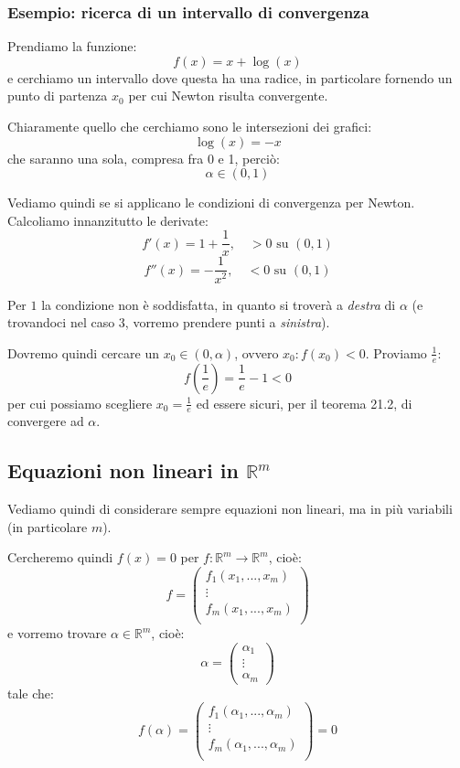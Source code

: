 \documentclass[a4paper,11pt]{article}
\begin{document}
\subsubsection{Esempio: ricerca di un intervallo di convergenza}
Prendiamo la funzione:
$$
f(x) = x + \log(x)
$$
e cerchiamo un intervallo dove questa ha una radice, in particolare fornendo un punto di partenza $x_0$ per cui Newton risulta convergente.

Chiaramente quello che cerchiamo sono le intersezioni dei grafici:
$$
\log(x) = -x
$$
che saranno una sola, compresa fra 0 e 1, perciò:
$$
\alpha \in (0, 1)
$$

Vediamo quindi se si applicano le condizioni di convergenza per Newton.
Calcoliamo innanzitutto le derivate:
$$
f'(x) = 1 + \frac{1}{x}, \quad > 0 \text{ su } (0, 1)
$$
$$
f''(x) = -\frac{1}{x^2}, \quad < 0 \text{ su } (0, 1)
$$

Per $1$ la condizione non è soddisfatta, in quanto si troverà a \textit{destra} di $\alpha$ (e trovandoci nel caso 3, vorremo prendere punti a \textit{sinistra}).

Dovremo quindi cercare un $x_0 \in (0, \alpha)$, ovvero $x_0 : f(x_0) < 0$.
Proviamo $\frac{1}{e}$:
$$
f\left(\frac{1}{e}\right) = \frac{1}{e} - 1 < 0
$$
per cui possiamo scegliere $x_0 = \frac{1}{e}$ ed essere sicuri, per il teorema 21.2, di convergere ad $\alpha$.

\subsection{Equazioni non lineari in $\mathbb{R}^m$}
Vediamo quindi di considerare sempre equazioni non lineari, ma in più variabili (in particolare $m$).

Cercheremo quindi $f(x) = 0$ per $f: \mathbb{R}^m \rightarrow \mathbb{R}^m$, cioè:
$$
f =
\begin{pmatrix}
	f_1 (x_1, ..., x_m) \\
	\vdots \\
	f_m (x_1, ..., x_m) \\
\end{pmatrix}
$$
e vorremo trovare $\alpha \in \mathbb{R}^m$, cioè:
$$
\alpha = 
\begin{pmatrix}
	\alpha_1 \\
	\vdots \\
	\alpha_m
\end{pmatrix}
$$
tale che:
$$
f(\alpha) = 
\begin{pmatrix}
	f_1 (\alpha_1, ..., \alpha_m) \\
	\vdots \\
	f_m (\alpha_1, ..., \alpha_m) \\
\end{pmatrix}
= 0
$$
\end{document}
